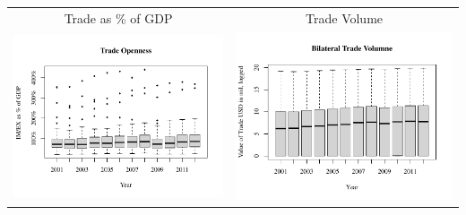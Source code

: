 \documentclass[reqno,onecolumn,letterpaper,12pt]{article}
\begin{document}
\begin{longtable}{c@{\hskip -.8cm}c}
Trade as \% of GDP &
Trade Volume\\
\includegraphics[height=.17\textheight, clip=true, trim=0cm 1cm 0cm 2cm]{SI_figures/descriptive_plots/TO_boxplot.pdf}   &
\includegraphics[height=.17\textheight, clip=true, trim=0cm 1cm 0cm 2cm]{SI_figures/descriptive_plots/Trade_boxplot.pdf}   \\


\end{longtable}
\end{document}

